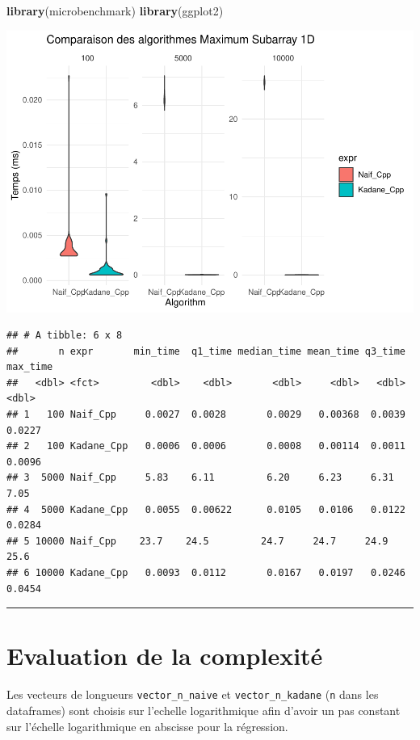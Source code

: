 \documentclass[
]{article}
\newenvironment{Shaded}{\begin{snugshade}}{\end{snugshade}}
\newcommand{\FunctionTok}[1]{\textcolor[rgb]{0.13,0.29,0.53}{\textbf{#1}}}
\newcommand{\NormalTok}[1]{#1}
\begin{document}
\begin{Shaded}
\begin{Highlighting}[]
\FunctionTok{library}\NormalTok{(microbenchmark)}
\FunctionTok{library}\NormalTok{(ggplot2)}
\end{Highlighting}
\end{Shaded}

\includegraphics{MaxSubarray1D_files/figure-latex/benchmark-1.pdf}

\begin{verbatim}
## # A tibble: 6 x 8
##       n expr       min_time  q1_time median_time mean_time q3_time max_time
##   <dbl> <fct>         <dbl>    <dbl>       <dbl>     <dbl>   <dbl>    <dbl>
## 1   100 Naif_Cpp     0.0027  0.0028       0.0029   0.00368  0.0039   0.0227
## 2   100 Kadane_Cpp   0.0006  0.0006       0.0008   0.00114  0.0011   0.0096
## 3  5000 Naif_Cpp     5.83    6.11         6.20     6.23     6.31     7.05  
## 4  5000 Kadane_Cpp   0.0055  0.00622      0.0105   0.0106   0.0122   0.0284
## 5 10000 Naif_Cpp    23.7    24.5         24.7     24.7     24.9     25.6   
## 6 10000 Kadane_Cpp   0.0093  0.0112       0.0167   0.0197   0.0246   0.0454
\end{verbatim}

\begin{center}\rule{0.5\linewidth}{0.5pt}\end{center}

\section{Evaluation de la
complexité}\label{evaluation-de-la-complexituxe9}

Les vecteurs de longueurs \texttt{vector\_n\_naive} et
\texttt{vector\_n\_kadane} (\texttt{n} dans les dataframes) sont choisis
sur l'echelle logarithmique afin d'avoir un pas constant sur l'échelle
logarithmique en abscisse pour la régression.
\end{document}
